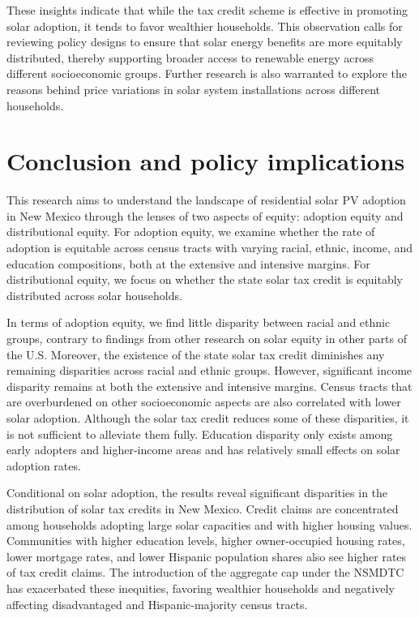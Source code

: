 \documentclass[11pt,twoside,letterpaper]{article}
\begin{document}
These insights indicate that while the tax credit scheme is effective in promoting solar adoption, it tends to favor wealthier households. This observation calls for reviewing policy designs to ensure that solar energy benefits are more equitably distributed, thereby supporting broader access to renewable energy across different socioeconomic groups. Further research is also warranted to explore the reasons behind price variations in solar system installations across different households.


\section[Conclusion]{Conclusion and policy implications}

This research aims to understand the landscape of residential solar PV adoption in New Mexico through the lenses of two aspects of equity: adoption equity and distributional equity. For adoption equity, we examine whether the rate of adoption is equitable across census tracts with varying racial, ethnic, income, and education compositions, both at the extensive and intensive margins. For distributional equity, we focus on whether the state solar tax credit is equitably distributed across solar households.

In terms of adoption equity, we find little disparity between racial and ethnic groups, contrary to findings from other research on solar equity in other parts of the U.S. Moreover, the existence of the state solar tax credit diminishes any remaining disparities across racial and ethnic groups. However, significant income disparity remains at both the extensive and intensive margins. Census tracts that are overburdened on other socioeconomic aspects are also correlated with lower solar adoption. Although the solar tax credit reduces some of these disparities, it is not sufficient to alleviate them fully. Education disparity only exists among early adopters and higher-income areas and has relatively small effects on solar adoption rates.

Conditional on solar adoption, the results reveal significant disparities in the distribution of solar tax credits in New Mexico. Credit claims are concentrated among households adopting large solar capacities and with higher housing values. Communities with higher education levels, higher owner-occupied housing rates, lower mortgage rates, and lower Hispanic population shares also see higher rates of tax credit claims. The introduction of the aggregate cap under the NSMDTC has exacerbated these inequities, favoring wealthier households and negatively affecting disadvantaged and Hispanic-majority census tracts.
\end{document}
